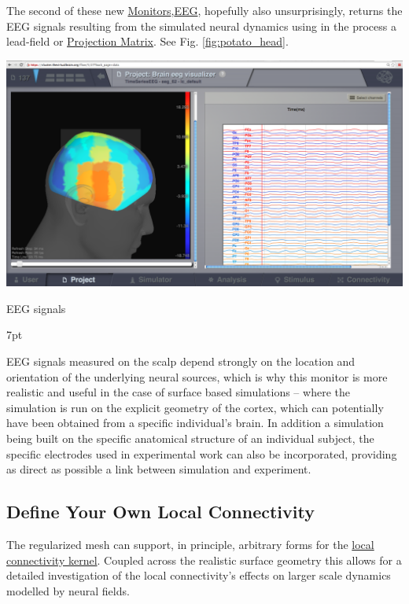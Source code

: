 \documentclass{tufte-handout}
\newenvironment{blah}{%
  \def\FrameCommand{%
    \hspace{1pt}%
    {\color{DarkOrange}\vrule width 2pt}%
    {\color{PeachPuff}\vrule width 4pt}%
    \colorbox{PeachPuff}%
  }%
  \MakeFramed{\advance\hsize-\width\FrameRestore}%
  \noindent\hspace{-4.55pt}%
  \begin{adjustwidth}{}{7pt}%
  \vspace{2pt}\vspace{2pt}%
}
{%
  \vspace{2pt}\end{adjustwidth}\endMakeFramed%
}
\begin{document}
The second of these new \underline{Monitors},\underline{EEG}, hopefully also
unsurprisingly, returns the EEG signals resulting from the simulated neural
dynamics using in the process a lead-field or \underline{Projection Matrix}.  See Fig. \ref{fig:potato_head}.
\begin{marginfigure}
  \includegraphics[width=\linewidth]{Handout_UI_BuildingYourOwnBrainNetworkModel_DefaultLocalConnectivityPotatoHead}%
  \caption{EEG signals}%
  \label{fig:potato_head}%
\end{marginfigure}

\begin{blah}
EEG signals measured on the scalp depend strongly on the location
and orientation of the underlying neural sources, which is why this monitor is
more realistic and useful in the case of surface based simulations -- where
the simulation is run on the explicit geometry of the cortex, which can
potentially have been obtained from a specific individual's brain. 
In addition a simulation being built on the specific anatomical structure of an individual
subject, the specific electrodes used in experimental work can also be
incorporated, providing as direct as possible a link between simulation and
experiment. 
\end{blah}

\subsection{Define Your Own Local Connectivity}\label{sec:local_connectivity}

The regularized mesh can support, in principle, arbitrary forms for the
\underline{local connectivity kernel}. Coupled across the realistic surface geometry this
allows for a detailed investigation of the local connectivity's effects on
larger scale dynamics modelled by neural fields.
\end{document}
